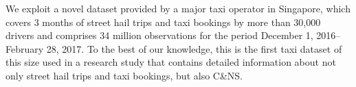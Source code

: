 \documentclass[reviewmode]{restat}
\begin{document}


We exploit a novel dataset provided by a major taxi operator in Singapore,
which covers 3 months of street hail trips and taxi bookings by more than 30,000 drivers and comprises 34
million observations for the period December 1, 2016--February 28, 2017. To the best of our knowledge, 
this is the first taxi dataset of this size used in a research study that contains detailed information 
about not only street hail trips and taxi bookings, but also C\&NS. 
\end{document}
